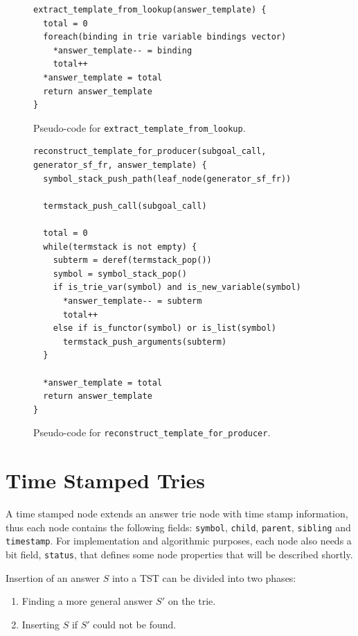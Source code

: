 \begin{figure}[ht]
\begin{Verbatim}
extract_template_from_lookup(answer_template) {
  total = 0
  foreach(binding in trie variable bindings vector)
    *answer_template-- = binding
    total++
  *answer_template = total
  return answer_template
}
\end{Verbatim}
\caption{Pseudo-code for \texttt{extract\_template\_from\_lookup}.}
\label{fig:extract_template_from_lookup}
\end{figure}

\begin{figure}[ht]
\begin{Verbatim}
reconstruct_template_for_producer(subgoal_call, generator_sf_fr, answer_template) {
  symbol_stack_push_path(leaf_node(generator_sf_fr))
  
  termstack_push_call(subgoal_call)
  
  total = 0
  while(termstack is not empty) {
    subterm = deref(termstack_pop())
    symbol = symbol_stack_pop()
    if is_trie_var(symbol) and is_new_variable(symbol)
      *answer_template-- = subterm
      total++
    else if is_functor(symbol) or is_list(symbol)
      termstack_push_arguments(subterm)
  }
  
  *answer_template = total
  return answer_template
}
\end{Verbatim}
\caption{Pseudo-code for \texttt{reconstruct\_template\_for\_producer}.}
\label{fig:reconstruct_template_for_producer}
\end{figure}

\section{Time Stamped Tries}

A time stamped node extends an answer trie node with time stamp information, thus
each node contains the following fields: \texttt{symbol}, \texttt{child}, \texttt{parent}, \texttt{sibling}
and \texttt{timestamp}. For implementation and algorithmic purposes, each node also needs a bit field,
\texttt{status}, that defines some node properties that will be described shortly.

Insertion of an answer $S$ into a TST can be divided into two phases:

\begin{enumerate}
  \item Finding a more general answer $S'$ on the trie.
  \item Inserting $S$ if $S'$ could not be found.
\end{enumerate}

